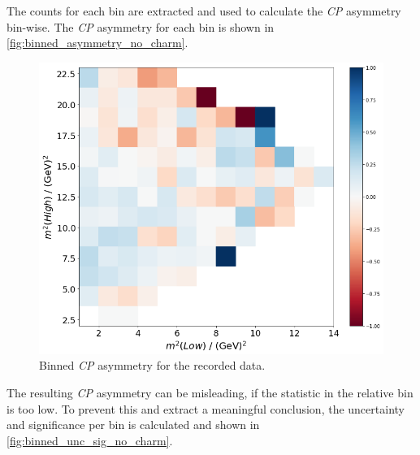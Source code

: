 The counts for each bin are extracted and used to calculate the \textit{CP} asymmetry bin-wise. The \textit{CP} asymmetry for each bin is shown in \autoref{fig:binned_asymmetry_no_charm}. 
\begin{figure}
  \centering
  \includegraphics[width = .45\textwidth]{"content/pics/binned_asymmetry_no_charm.png"}
  \caption{Binned \textit{CP} asymmetry for the recorded data.}
  \label{fig:binned_asymmetry_no_charm}
\end{figure}
The resulting \textit{CP} asymmetry can be misleading, if the statistic in the relative bin is too low. To prevent this and extract a meaningful conclusion, the uncertainty and significance per bin is calculated and shown in \autoref{fig:binned_unc_sig_no_charm}.
